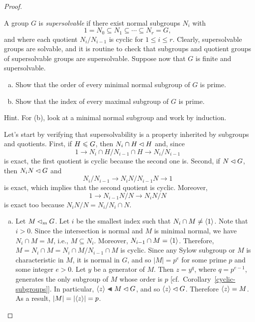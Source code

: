 \begin{proof}
\begin{probl}\label{problem-3.B.7}
    A group\/ $G$ is \textsl{supersolvable} if there exist normal subgroups\/ $N_i$ with
    $$
        1 = N_0 \subseteq N_1 \subseteq \cdots \subseteq N_r = G,
    $$
    and where each quotient\/ $N_i / N_{i-1}$ is cyclic for\/ $1\le i\le r$. Clearly, supersolvable groups are solvable, and it is routine to check that subgroups and quotient groups of supersolvable groups are supersolvable. Suppose now that\/ $G$ is finite and supersolvable.
    \begin{enumerate}[a),font=\upshape]
        \item Show that the order of every minimal normal subgroup of\/ $G$ is prime.
        \item Show that the index of every maximal subgroup of\/ $G$ is prime.
    \end{enumerate}
    {\upshape Hint. For (b), look at a minimal normal subgroup and work by induction.}
\end{probl}

\begin{solution} Let's start by verifying that supersolvability is a property inherited by subgroups and quotients. First, if $H\leqslant G$, then $N_i\cap H\lhd H$ and, since 
$$
    1\to N_i\cap H/N_{i-1}\cap H \to N_i/N_{i-1}
$$
is exact, the first quotient is cyclic because the second one is. Second, if $N\lhd G$, then $N_iN\lhd G$ and
$$
    N_i/N_{i-1}\to N_iN/N_{i-1}N\to1
$$
is exact, which implies that the second quotient is cyclic. Moreover,
$$
    1\to N_{i-1}N/N \to N_iN/N
$$
is exact too because $N_iN/N=N_i/N_i\cap N$.

\begin{enumerate}[a),font=\upshape]
    \item Let $M\lhd_m G$. Let $i$ be the smallest index such that $N_i\cap M\ne\langle1\rangle$. Note that $i>0$. Since the intersection is normal and $M$ is minimal normal, we have $N_i\cap M=M$, i.e., $M\subseteq N_i$. Moreover, $N_{i-1}\cap M=\langle1\rangle$. Therefore, $M=N_i\cap M=N_i\cap M/N_{i-1}\cap M$ is cyclic. Since any Sylow subgroup or $M$ is characteristic in $M$, it is normal in $G$, and so $|M|=p^e$ for some prime $p$ and some integer $e>0$. Let $y$ be a generator of $M$. Then $z=y^q$, where $q=p^{e-1}$, generates the only subgroup of $M$ whose order is $p$ [cf.~Corollary~\ref{cyclic-subgroups}]. In particular, $\gen z\ch M\normal G$, and so $\langle z\rangle\lhd G$. Therefore $\langle z\rangle=M$. As a result, $|M|=|\langle z\rangle|=p$.


\end{enumerate}
\end{solution}
\end{proof}
